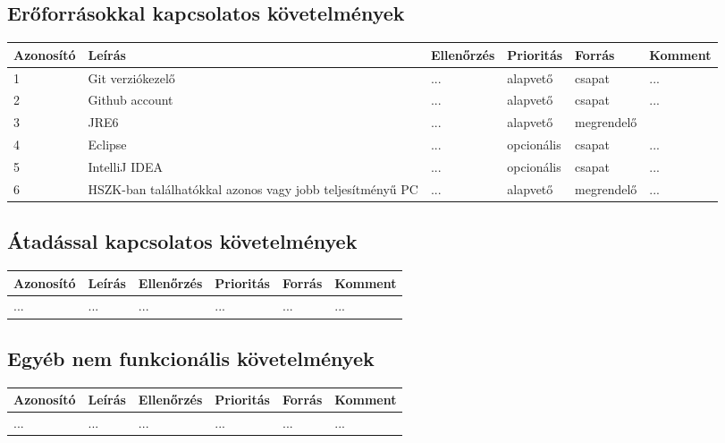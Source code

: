 \subsection{Erőforrásokkal kapcsolatos követelmények}


\begin{longtable}{| l | p{5cm} | l | l | l | l |}
\hline
\textbf{Azonosító}   & \textbf{Leírás} & \textbf{Ellenőrzés} & \textbf{Prioritás} & \textbf{Forrás} & \textbf{Komment} \tabularnewline
\hline\hline
1 & Git verziókezelő & ... & alapvető & csapat & ... \tabularnewline
\hline
2 & Github account & ... & alapvető & csapat & ... \tabularnewline
\hline
3 & JRE6 & ... & alapvető & megrendelő & \tabularnewline
\hline
4 & Eclipse & ... & opcionális & csapat & ... \tabularnewline
\hline
5 & IntelliJ IDEA & ... & opcionális & csapat & ... \tabularnewline
\hline
6 & HSZK-ban találhatókkal azonos vagy jobb teljesítményű PC & ... & alapvető & megrendelő & ...  \tabularnewline
\hline
\end{longtable}


\subsection{Átadással kapcsolatos követelmények}

\begin{longtable}{| l | l | l | l | l | l |}
\hline
\textbf{Azonosító}   & \textbf{Leírás} & \textbf{Ellenőrzés} & \textbf{Prioritás} & \textbf{Forrás} & \textbf{Komment} \tabularnewline
\hline\hline
... & ... & ... & ... & ... & ... \tabularnewline
\hline
\end{longtable}

\subsection{Egyéb nem funkcionális követelmények}

\begin{longtable}{| l | l | l | l | l | l |}
\hline
\textbf{Azonosító}   & \textbf{Leírás} & \textbf{Ellenőrzés} & \textbf{Prioritás} & \textbf{Forrás} & \textbf{Komment} \tabularnewline
\hline\hline
... & ... & ... & ... & ... & ... \tabularnewline
\hline
\end{longtable}


